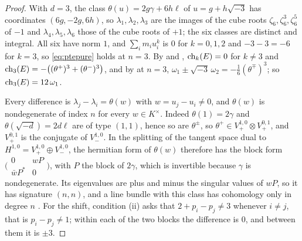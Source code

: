 \begin{proof}
With $d=3$, the class $\theta(u)=2g\gamma+6h\ell$ of $u=g+h\sqrt{-3}$ has
coordinates $(6g,-2g,6h)$, so $\lambda_{1},\lambda_{2},\lambda_{3}$ are the
images of the cube roots $\zeta_{6},\zeta_{6}^{3},\zeta_{6}^{5}$ of $-1$ and
$\lambda_{4},\lambda_{5},\lambda_{6}$ those of the cube roots of $+1$; the six
classes are distinct and integral. All six have norm $1$, and
$\sum_{i}m_{i}u_{i}^{k}$ is $0$ for $k=0,1,2$ and $-3-3=-6$ for $k=3$, so
\eqref{eq:ptepure} holds at $n=3$. By  and
, $\operatorname{ch}_{k}(E)=0$ for $k\ne3$ and
$\operatorname{ch}_{3}(E)=-\bigl((\theta^{+})^{3}+(\theta^{-})^{3}\bigr)$, and by
 at $n=3$,
$\omega_{1}\pm\sqrt{-3}\,\omega_{2}=-\frac16(\theta^{\mp})^{3}$; so
$\operatorname{ch}_{3}(E)=12\,\omega_{1}$.

Every difference is $\lambda_{j}-\lambda_{i}=\theta(w)$ with
$w=u_{j}-u_{i}\ne0$, and $\theta(w)$ is nondegenerate of index $n$ for every
$w\in K^{\times}$. Indeed $\theta(1)=2\gamma$ and $\theta(\sqrt{-d})=2d\ell$ are of
type $(1,1)$, hence so are $\theta^{\pm}$, so
$\theta^{+}\in V_{+}^{1,0}\otimes V_{+}^{0,1}$, and $V_{+}^{0,1}$ is the
conjugate of $V_{-}^{1,0}$. In the splitting of the tangent space dual to
$H^{1,0}=V_{+}^{1,0}\oplus V_{-}^{1,0}$, the hermitian form of $\theta(w)$
therefore has the block form
$\bigl(\begin{smallmatrix}0&wP\\ \bar wP^{*}&0\end{smallmatrix}\bigr)$, with $P$
the block of $2\gamma$, which is invertible because $\gamma$ is nondegenerate.
Its eigenvalues are plus and minus the singular values of $wP$, so it has
signature $(n,n)$, and a line bundle with this class has cohomology only in
degree $n$ \cite[Chapter~3]{BL04}. For the shift, condition (ii) asks that
$2+p_{i}-p_{j}\ne3$ whenever $i\ne j$, that is $p_{i}-p_{j}\ne1$; within each
of the two blocks the difference is $0$, and between them it is $\pm3$.


\end{proof}
